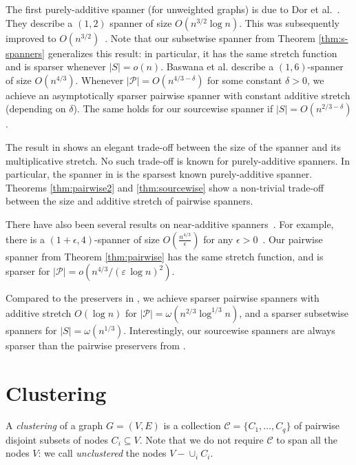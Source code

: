 \documentclass[a4paper,11pt]{article}
\theoremstyle{definition}
\newcommand{\cP}{\mathcal{P}}
\newcommand{\cC}{\mathcal{C}}
\newcommand{\eps}{\varepsilon}
\begin{document}
The first purely-additive spanner (for unweighted graphs) is due to Dor et al.~\cite{DHZ97}. They describe a $(1,2)$ spanner of 
size $O(n^{3/2}\log n)$. This was subsequently improved to $O(n^{3/2})$~\cite{EP04}. Note that our subsetwise spanner from Theorem \ref{thm:s-spanners} generalizes this result: in particular, it has the same stretch function and is sparser whenever $|S|=o(n)$.
Baswana et al. \cite{BKMP05} describe a $(1,6)$-spanner of size $O(n^{4/3})$. Whenever $|\cP|=O(n^{4/3-\delta})$ for some constant $\delta>0$, we achieve an asymptotically sparser pairwise spanner with constant additive stretch (depending on $\delta$). The same holds for our sourcewise spanner if $|S|=O(n^{2/3-\delta})$.






The result in \cite{HZ96} shows an elegant trade-off between the size of the spanner and its multiplicative stretch. No such trade-off is known for purely-additive spanners. In particular, the spanner in \cite{BKMP05} is the sparsest known purely-additive spanner. Theorems \ref{thm:pairwise2} and \ref{thm:sourcewise} show a non-trivial trade-off between the size and additive stretch of pairwise spanners. 

There have also been several results on near-additive spanners~\cite{EP04,E05,TZ06}. For example, there is a $(1+\epsilon, 4)$-spanner of size $O(\frac{n^{4/3}}{\epsilon})$ for any 
$\epsilon > 0$~\cite{EP04}. Our pairwise spanner from Theorem \ref{thm:pairwise} has the same stretch function, and is sparser for $|\cP|=o(n^{4/3}/(\eps\,\log n)^2)$. 

Compared to the preservers in \cite{CE05}, we achieve sparser  pairwise spanners with additive stretch $O(\log n)$ for $|\cP|=\omega(n^{2/3}\log^{1/3} n)$, and a sparser subsetwise spanners for $|S|=\omega(n^{1/3})$. 
Interestingly, our sourcewise spanners are always sparser than the pairwise preservers from \cite{CE05}. 








\section{Clustering}
\label{section-clustering}

A \emph{clustering} of a graph $G=(V,E)$ is a collection $\cC=\{C_1,\ldots,C_q\}$ of pairwise disjoint subsets of nodes $C_i\subseteq V$. Note that we do not require $\cC$ to span all the nodes $V$: we call \emph{unclustered} the nodes $V-\cup_i C_i$.
\end{document}
